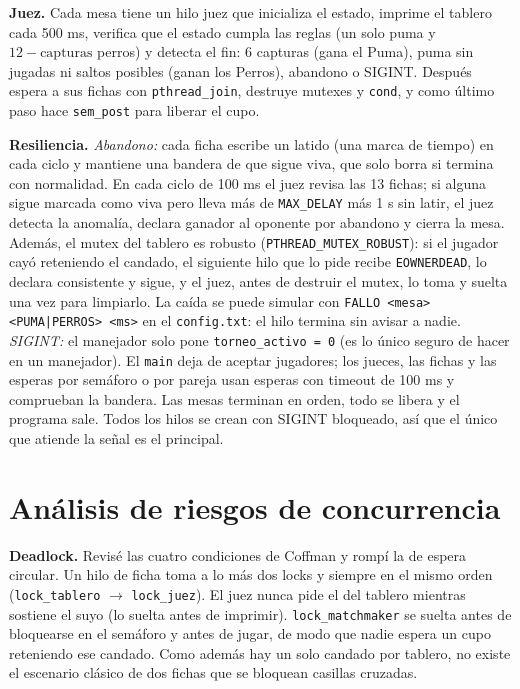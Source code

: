 \documentclass[11pt,a4paper]{article}
\newcommand{\cod}[1]{\texttt{\small #1}}
\begin{document}
\textbf{Juez.} Cada mesa tiene un hilo juez que inicializa el estado, imprime el tablero cada 500 ms, verifica que el estado cumpla las reglas (un solo puma y \mbox{$12-\mathrm{capturas}$} perros) y detecta el fin: 6 capturas (gana el Puma), puma sin jugadas ni saltos posibles (ganan los Perros), abandono o SIGINT. Después espera a sus fichas con \cod{pthread\_join}, destruye mutexes y \cod{cond}, y como último paso hace \cod{sem\_post} para liberar el cupo.

\textbf{Resiliencia.} \emph{Abandono:} cada ficha escribe un latido (una marca de tiempo) en cada ciclo y mantiene una bandera de que sigue viva, que solo borra si termina con normalidad. En cada ciclo de 100 ms el juez revisa las 13 fichas; si alguna sigue marcada como viva pero lleva más de \cod{MAX\_DELAY} más 1 s sin latir, el juez detecta la anomalía, declara ganador al oponente por abandono y cierra la mesa. Además, el mutex del tablero es robusto (\cod{PTHREAD\_MUTEX\_ROBUST}): si el jugador cayó reteniendo el candado, el siguiente hilo que lo pide recibe \cod{EOWNERDEAD}, lo declara consistente y sigue, y el juez, antes de destruir el mutex, lo toma y suelta una vez para limpiarlo. La caída se puede simular con \cod{FALLO <mesa> <PUMA|PERROS> <ms>} en el \cod{config.txt}: el hilo termina sin avisar a nadie. \emph{SIGINT:} el manejador solo pone \cod{torneo\_activo = 0} (es lo único seguro de hacer en un manejador). El \cod{main} deja de aceptar jugadores; los jueces, las fichas y las esperas por semáforo o por pareja usan esperas con timeout de 100 ms y comprueban la bandera. Las mesas terminan en orden, todo se libera y el programa sale. Todos los hilos se crean con SIGINT bloqueado, así que el único que atiende la señal es el principal.

\section{Análisis de riesgos de concurrencia}

\textbf{Deadlock.} Revisé las cuatro condiciones de Coffman y rompí la de espera circular. Un hilo de ficha toma a lo más dos locks y siempre en el mismo orden (\cod{lock\_tablero} $\to$ \cod{lock\_juez}). El juez nunca pide el del tablero mientras sostiene el suyo (lo suelta antes de imprimir). \cod{lock\_matchmaker} se suelta antes de bloquearse en el semáforo y antes de jugar, de modo que nadie espera un cupo reteniendo ese candado. Como además hay un solo candado por tablero, no existe el escenario clásico de dos fichas que se bloquean casillas cruzadas.
\end{document}
